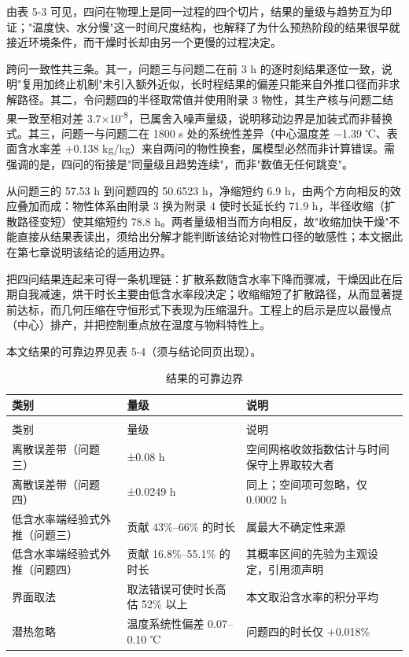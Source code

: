 由表 5-3 可见，四问在物理上是同一过程的四个切片，结果的量级与趋势互为印证；"温度快、水分慢"这一时间尺度结构，也解释了为什么预热阶段的结果很早就接近环境条件，而干燥时长却由另一个更慢的过程决定。

跨问一致性共三条。其一，问题三与问题二在前 3 h 的逐时刻结果逐位一致，说明"复用加终止机制"未引入额外近似，长时程结果的偏差只能来自外推口径而非求解路径。其二，令问题四的半径取常值并使用附录 3 物性，其生产核与问题二结果一致至相对差 3.7×10\textsuperscript{-8}，已属舍入噪声量级，说明移动边界是加装式而非替换式。其三，问题一与问题二在 1800 s 处的系统性差异（中心温度差 −1.39 ℃、表面含水率差 +0.138 kg/kg）来自两问的物性换套，属模型必然而非计算错误。需强调的是，四问的衔接是"同量级且趋势连续"，而非"数值无任何跳变"。

从问题三的 57.53 h 到问题四的 50.6523 h，净缩短约 6.9 h，由两个方向相反的效应叠加而成：物性体系由附录 3 换为附录 4 使时长延长约 71.9 h，半径收缩（扩散路径变短）使其缩短约 78.8 h。两者量级相当而方向相反，故"收缩加快干燥"不能直接从结果表读出，须给出分解才能判断该结论对物性口径的敏感性；本文据此在第七章说明该结论的适用边界。

把四问结果连起来可得一条机理链：扩散系数随含水率下降而骤减，干燥因此在后期自我减速，烘干时长主要由低含水率段决定；收缩缩短了扩散路径，从而显著提前达标，而几何压缩在守恒形式下表现为压缩温升。工程上的启示是应以最慢点（中心）排产，并把控制重点放在温度与物料特性上。

本文结果的可靠边界见表 5-4（须与结论同页出现）。



\begin{longtable}{>{\centering\arraybackslash}m{\dimexpr 0.326\tblw\relax}>{\centering\arraybackslash}m{\dimexpr 0.299\tblw\relax}>{\centering\arraybackslash}m{\dimexpr 0.375\tblw\relax}}
  \caption{结果的可靠边界}\label{tab:5-4}\\
  \toprule
    类别 & 量级 & 说明 \\
  \midrule
  \endfirsthead
  \multicolumn{3}{r}{\footnotesize（续）}\\
  \toprule
    类别 & 量级 & 说明 \\
  \midrule
  \endhead
  \bottomrule
  \endfoot
  \bottomrule
  \endlastfoot
  离散误差带（问题三） & ±0.08 h & 空间网格收敛指数估计与时间保守上界取较大者 \\
  离散误差带（问题四） & ±0.0249 h & 同上；空间项可忽略，仅 0.0002 h \\
  低含水率端经验式外推（问题三） & 贡献 43\%–66\% 的时长 & 属最大不确定性来源 \\
  低含水率端经验式外推（问题四） & 贡献 16.8\%–55.1\% 的时长 & 其概率区间的先验为主观设定，引用须声明 \\
  界面取法 & 取法错误可使时长高估 52\% 以上 & 本文取沿含水率的积分平均 \\
  潜热忽略 & 温度系统性偏差 0.07–0.10 ℃ & 问题四的时长仅 +0.018\% \\
\end{longtable}

